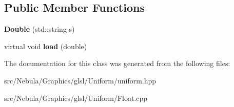 \subsection*{\-Public \-Member \-Functions}
\begin{DoxyCompactItemize}
\item 
\hypertarget{classNeb_1_1glsl_1_1Uniform_1_1Scalar_1_1Double_a69bb07fb2fa171a1067bf7558b91ec57}{{\bfseries \-Double} (std\-::string s)}\label{classNeb_1_1glsl_1_1Uniform_1_1Scalar_1_1Double_a69bb07fb2fa171a1067bf7558b91ec57}

\item 
\hypertarget{classNeb_1_1glsl_1_1Uniform_1_1Scalar_1_1Double_aa3e09a61118c65d3af510b3f7b8080ec}{virtual void {\bfseries load} (double)}\label{classNeb_1_1glsl_1_1Uniform_1_1Scalar_1_1Double_aa3e09a61118c65d3af510b3f7b8080ec}

\end{DoxyCompactItemize}


\-The documentation for this class was generated from the following files\-:\begin{DoxyCompactItemize}
\item 
src/\-Nebula/\-Graphics/glsl/\-Uniform/uniform.\-hpp\item 
src/\-Nebula/\-Graphics/glsl/\-Uniform/\-Float.\-cpp\end{DoxyCompactItemize}
